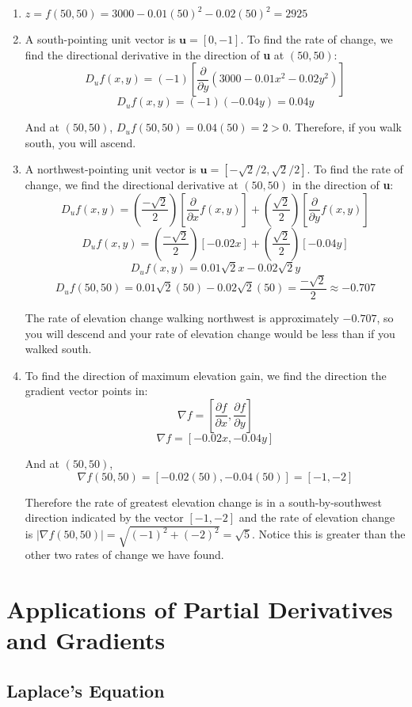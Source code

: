 \begin{Answer}[ref = maximum]
\begin{enumerate}
    \item $z = f(50, 50) = 3000 - 0.01(50)^2 - 0.02(50)^2 = 2925$
    \item A south-pointing unit vector is $\textbf{u} = \left[ 0, -1 \right]$. 
    To find the rate of change, we find the directional derivative in the 
    direction of \textbf{u} at $(50, 50)$:
    $$D_u f(x, y) = \left( -1 \right) \left[ \frac{\partial}{\partial y} 
    \left( 3000 - 0.01x^2 - 0.02y^2 \right) \right]$$
    $$D_u f(x, y) = \left( -1 \right) \left( -0.04 y \right) = 0.04y$$

    And at $(50, 50)$, $D_u f(50, 50) = 0.04(50) = 2 > 0$. Therefore, if you 
    walk south, you will ascend.
    \item A northwest-pointing unit vector is $\textbf{u} = \left[ -\sqrt{2}
    /2, \sqrt{2}/2 \right]$. To find the rate of change, we find the 
    directional derivative at $(50, 50)$ in the direction of \textbf{u}:
    $$D_u f(x, y) = \left( \frac{-\sqrt{2}}{2} \right) \left[ \frac{\partial}{
    \partial x} f(x, y) \right] + \left( \frac{\sqrt{2}}{2} \right) \left[ 
    \frac{\partial}{\partial y} f(x, y) \right]$$
    $$D_u f(x, y) = \left( \frac{-\sqrt{2}}{2} \right) \left[ -0.02x \right] 
    + \left( \frac{\sqrt{2}}{2} \right) \left[ -0.04 y \right]$$
    $$D_u f(x, y) = 0.01\sqrt{2}x - 0.02\sqrt{2}y$$
    $$D_u f(50, 50) = 0.01 \sqrt{2} \left( 50 \right) - 0.02 \sqrt{2} \left( 
    50 \right) = \frac{-\sqrt{2}}{2} \approx -0.707$$

    The rate of elevation change walking northwest is approximately $-0.707$, 
    so you will descend and your rate of elevation change would be less than 
    if you walked south. 

    \item To find the direction of maximum elevation gain, we find the 
    direction the gradient vector points in:
    $$\nabla f = \left[ \frac{\partial f}{\partial x}, \frac{\partial f}{
    \partial y} \right]$$
    $$\nabla f = \left[ -0.02x, -0.04y \right]$$

    And at $(50, 50)$, 
    $$\nabla f(50, 50) = \left[ -0.02(50), -0.04(50) \right] = \left[ -1, -2 
    \right]$$

    Therefore the rate of greatest elevation change is in a south-by-southwest 
    direction indicated by the vector $\left[ -1, -2 \right]$ and the rate of 
    elevation change is $\left| \nabla f(50, 50) \right| = \sqrt{(-1)^2 + (-2)^
    2} = \sqrt{5}$. Notice this is greater than the other two rates of change 
    we have found. 
\end{enumerate}
\end{Answer}

\section{Applications of Partial Derivatives and Gradients}

\subsection{Laplace's Equation}